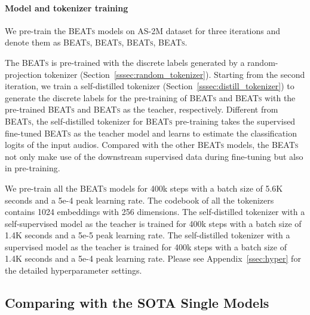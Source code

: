 \documentclass{article}
\theoremstyle{plain}
\theoremstyle{definition}
\theoremstyle{remark}
\newcommand\our{\textsc{BEATs}}
\begin{document}
\paragraph{Model and tokenizer training}
We pre-train the \our{} models on AS-2M dataset for three iterations and denote them as \our{}, \our{}, \our{}, \our{}.

The \our{} is pre-trained with the discrete labels generated by a random-projection tokenizer (Section~\ref{sssec:random_tokenizer}). 
Starting from the second iteration, we train a self-distilled tokenizer (Section~\ref{sssec:distill_tokenizer}) to generate the discrete labels for the pre-training of \our{} and \our{} with the pre-trained \our{} and \our{} as the teacher, respectively.
Different from \our{}, the self-distilled tokenizer for \our{} pre-training takes the supervised fine-tuned \our{} as the teacher model and learns to estimate the classification logits of the input audios.
Compared with the other \our{} models, the \our{} not only make use of the downstream supervised data during fine-tuning but also in pre-training.

We pre-train all the \our{} models for 400k steps with a batch size of 5.6K seconds and a 5e-4 peak learning rate.
The codebook of all the tokenizers contains 1024 embeddings with 256 dimensions.
The self-distilled tokenizer with a self-supervised model as the teacher is trained for 400k steps with a batch size of 1.4K seconds and a 5e-5 peak learning rate.
The self-distilled tokenizer with a supervised model as the teacher is trained for 400k steps with a batch size of 1.4K seconds and a 5e-4 peak learning rate.
Please see Appendix~\ref{ssec:hyper} for the detailed hyperparameter settings.

\subsection{Comparing with the SOTA Single Models}
\end{document}
